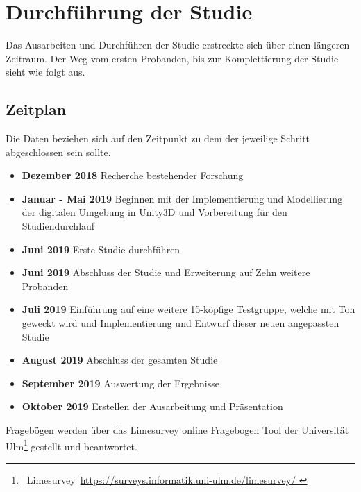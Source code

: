 \chapter{Durchführung der Studie}

Das Ausarbeiten und Durchführen der Studie erstreckte sich über einen längeren Zeitraum. Der Weg vom ersten Probanden, bis zur Komplettierung der Studie sieht wie folgt aus.
\section{Zeitplan}
Die Daten beziehen sich auf den Zeitpunkt zu dem der jeweilige Schritt abgeschlossen sein sollte.
\begin{itemize}
    \item \textbf{Dezember 2018} Recherche bestehender Forschung
    \item \textbf{Januar - Mai 2019} Beginnen mit der Implementierung und Modellierung der digitalen Umgebung in Unity3D und Vorbereitung für den Studiendurchlauf
    \item \textbf{Juni 2019} Erste Studie durchführen
    \item \textbf{Juni 2019} Abschluss der Studie und Erweiterung auf Zehn weitere Probanden
    \item \textbf{Juli 2019} Einführung auf eine weitere 15-köpfige Testgruppe, welche mit Ton geweckt wird und Implementierung und Entwurf dieser neuen angepassten Studie
    \item \textbf{August 2019} Abschluss der gesamten Studie
    \item \textbf{September 2019} Auswertung der Ergebnisse
    \item \textbf{Oktober 2019} Erstellen der Ausarbeitung und Präsentation
\end{itemize}

Fragebögen werden über das Limesurvey online Fragebogen Tool der Universität Ulm\footnote{~Limesurvey~\url{https://surveys.informatik.uni-ulm.de/limesurvey/
}} gestellt und beantwortet.
